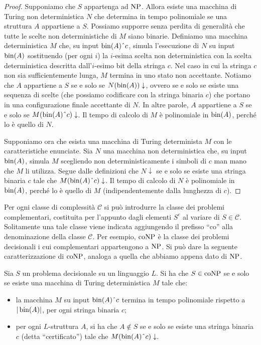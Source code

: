 \begin{proof}
  Supponiamo che $S$ appartenga ad $\operatorname{NP}$. Allora esiste una macchina di Turing non deterministica $N$ che determina in tempo polinomiale se una struttura $A$ appartiene a $S$.
  Possiamo supporre senza perdita di generalità che tutte le scelte non deterministiche di $M$ siano binarie.
  Definiamo una macchina deterministica $M$ che, su input $\bin(A)\string^ c$, simula l'esecuzione di $N$ su input $\operatorname{bin}(A)$ sostituendo (per ogni $i$) la $i$-esima scelta non deterministica con la scelta deterministica descritta dall'$i$-esimo bit della stringa $c$. Nel caso in cui la stringa $c$ non sia sufficientemente lunga, $M$ termina in uno stato non accettante.
  Notiamo che $A$ appartiene a $S$ se e solo se $N(\operatorname{bin}(A))\downarrow$, ovvero se e solo se esiste una sequenza di scelte (che possiamo codificare con la stringa binaria $c$) che portano in una configurazione finale accettante di $N$. In altre parole, $A$ appartiene a $S$ se e solo se $M(\bin(A)\string^c)\downarrow$.
  Il tempo di calcolo di $M$ è polinomiale in $\operatorname{bin}(A)$, perché lo è quello di $N$.
  
  Supponiamo ora che esista una macchina di Turing determinista $M$ con le caratteristiche enunciate.
  Sia $N$ una macchina non deterministica che, su input $\operatorname{bin}(A)$, simula $M$ scegliendo non deterministicamente i simboli di $c$ man mano che $M$ li utilizza.
  Segue dalle definizioni che $N\downarrow$ se e solo se esiste una stringa binaria $c$ tale che $M(\bin(A)\string^c)\downarrow$.
  Il tempo di calcolo di $N$ è polinomiale in $\operatorname{bin}(A)$, perché lo è quello di $M$ (indipendentemente dalla lunghezza di $c$).
\end{proof}


Per ogni classe di complessità $\mathcal{C}$ si può introdurre la classe dei problemi complementari, costituita per l'appunto dagli elementi $S^c$ al variare di $S\in\mathcal{C}$.
Solitamente una tale classe viene indicata aggiungendo il prefisso ``co'' alla denominazione della classe $\mathcal{C}$.
Per esempio, $\operatorname{coNP}$ è la classe dei problemi decisionali i cui complementari appartengono a $\operatorname{NP}$.
Si può dare la seguente caratterizzazione di $\operatorname{coNP}$, analoga a quella che abbiamo appena dato di $\operatorname{NP}$.

\begin{proposizione}
  \label{prop:caratterizzazione-conp}
  Sia $S$ un problema decisionale su un linguaggio $L$.
  Si ha che $S \in \operatorname{coNP}$ se e solo se esiste una macchina di Turing deterministica $M$ tale che:
  \begin{itemize}
    \item la macchina $M$ su input $\bin(A)\string^ c$ termina in tempo polinomiale rispetto a $|\operatorname{bin}(A)|$, per ogni stringa binaria $c$;
    \item per ogni $L$-struttura $A$, si ha che $A\not\in S$ se e solo se esiste una stringa binaria $c$ (detta ``certificato'') tale che $M(\bin(A)\string^ c)\downarrow$.
  \end{itemize}
\end{proposizione}

